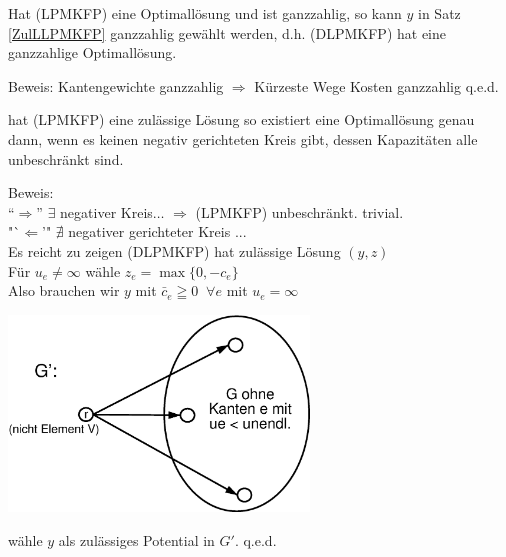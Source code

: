 \begin{satz}
Hat (LPMKFP) eine Optimallösung und ist ganzzahlig, so kann $y$ in Satz
\ref{ZulLLPMKFP} ganzzahlig gewählt werden, d.h. (DLPMKFP) hat eine
ganzzahlige Optimallösung.
\end{satz}
Beweis:
Kantengewichte ganzzahlig $\Rightarrow$ Kürzeste Wege Kosten ganzzahlig
q.e.d.
\begin{satz} \label{LösungLPMKFPopt3}
hat (LPMKFP) eine zulässige Lösung so existiert eine Optimallösung genau
dann, wenn es keinen negativ gerichteten Kreis gibt, dessen Kapazitäten
alle unbeschränkt sind.
\end{satz}
Beweis:\\
"`$\Rightarrow$"' $\exists$ negativer Kreis$\ldots$ $\Rightarrow$ (LPMKFP)
unbeschränkt. trivial.\\
"`$\Leftarrow$'" $\nexists$ negativer gerichteter Kreis ...\\
Es reicht zu zeigen (DLPMKFP) hat zulässige Lösung $(y,z)$\\
Für $u_{e} \neq \infty$ wähle $z_{e} = \max\{0,-c_{e}\}$\\
Also brauchen wir $y$ mit $\bar{c}_{e} \geqq 0 \; \; \forall e$ mit $u_{e} =
\infty$

\includegraphics[width=8cm]{bilder/4-1BeweisSatz44}

wähle $y$ als zulässiges Potential in $G'$. q.e.d.

